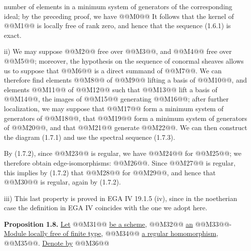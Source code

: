 number of elements in a minimum system of generators of the corresponding ideal; by the preceding proof, we have
@@M0@@
It follows that the kernel of @@M1@@ is locally free of rank zero, and hence that the sequence (1.6.1) is exact.

ii) We may suppose @@M2@@ free over @@M3@@, and @@M4@@ free over @@M5@@; moreover, the hypothesis on the sequence of conormal sheaves allows us to suppose that @@M6@@ is a direct summand of @@M7@@. We can therefore find elements @@M8@@ of @@M9@@ lifting a basis of @@M10@@, and elements @@M11@@ of @@M12@@ such that @@M13@@ lift a basis of @@M14@@, the images of @@M15@@ generating @@M16@@; after further localization, we may suppose that @@M17@@ form a minimum system of generators of @@M18@@, that @@M19@@ form a minimum system of generators of @@M20@@, and that @@M21@@ generate @@M22@@. We can then construct the diagram (1.7.1) and use the spectral sequence (1.7.3).

By (1.7.2), since @@M23@@ is regular, we have @@M24@@ for @@M25@@; we therefore obtain edge-isomorphisms: @@M26@@. Since @@M27@@ is regular, this implies by (1.7.2) that @@M28@@ for @@M29@@, and hence that @@M30@@ is regular, again by (1.7.2).

iii) This last property is proved in EGA IV 19.1.5 (iv), since in the noetherian case the definition in EGA IV coincides with the one we adopt here.

\textbf{Proposition 1.8.} \uline{Let} @@M31@@ \uline{be a scheme}, @@M32@@ \uline{an} @@M33@@-\uline{Module locally free of finite type}, @@M34@@ \uline{a regular homomorphism}, @@M35@@. \uline{Denote by} @@M36@@
